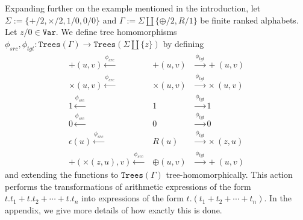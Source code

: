 \documentclass[12pt, a4paper]{article}
\newcommand{\Alphabet}{\ensuremath{\Sigma}}
\newcommand{\Variables}{\texttt{Var}}
\newcommand{\Trees}[1]{\ensuremath{\texttt{Trees}\left(#1\right)}}
\newcommand{\src}{\mathit{src}}
\newcommand{\sourceMap}{\ensuremath{\phi_{\src}}}
\newcommand{\tgt}{\mathit{tgt}}
\newcommand{\targetMap}{\ensuremath{\phi_{\tgt}}}
\begin{document}
\begin{example}\label{exmp:distributivity1}
    Expanding further on the example mentioned in the introduction, let $\Alphabet := \{+/2, \times/2, 1/0, 0/0\}$ and $\Gamma := \Alphabet \coprod \{\oplus/2, R/1\}$ be finite ranked alphabets. Let $z/0 \in \Variables$. We define tree homomorphisms $\sourceMap, \targetMap : \Trees{\Gamma} \to \Trees{\Alphabet \coprod \{z\}}$ by defining
    \begin{eqnarray*}
        +(u, v) \xleftarrow{\sourceMap} & +(u, v) & \xrightarrow{\targetMap} +(u, v)\\
        \times(u, v) \xleftarrow{\sourceMap} & \times(u, v) & \xrightarrow{\targetMap} \times(u, v)\\
        1 \xleftarrow{\sourceMap} & 1 & \xrightarrow{\targetMap} 1\\
        0 \xleftarrow{\sourceMap} & 0 & \xrightarrow{\targetMap} 0\\
        \epsilon(u) \xleftarrow{\sourceMap} & R(u) & \xrightarrow{\targetMap} \times(z, u)\\
        +(\times(z, u), v) \xleftarrow{\sourceMap} & \oplus(u, v) & \xrightarrow{\targetMap} +(u, v)
    \end{eqnarray*}
    and extending the functions to $\Trees{\Gamma}$ tree-homomorphically. This action performs the transformations of arithmetic expressions of the form $t.t_{1} + t.t_{2} + \cdots + t.t_{n}$ into expressions of the form $t.(t_{1} + t_{2} + \cdots + t_{n})$. In the appendix, we give more details of how exactly this is done.
\end{example}
\end{document}
